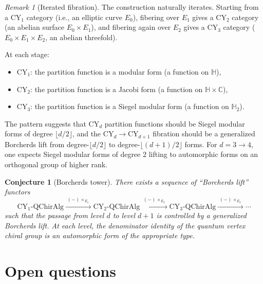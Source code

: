 \documentclass[11pt]{article}
\theoremstyle{plain}
\newtheorem{conjecture}[theorem]{Conjecture}
\theoremstyle{definition}
\theoremstyle{remark}
\newtheorem{remark}[theorem]{Remark}
\newcommand{\CY}{\mathrm{CY}}
\begin{document}
\begin{remark}[Iterated fibration]
\label{rmk:iterated}
The construction naturally iterates. Starting from a $\CY_1$ category (i.e., an
elliptic curve $E_0$), fibering over $E_1$ gives a $\CY_2$ category (an abelian
surface $E_0 \times E_1$), and fibering again over $E_2$ gives a $\CY_3$
category ($E_0 \times E_1 \times E_2$, an abelian threefold).

At each stage:
\begin{itemize}
\item $\CY_1$: the partition function is a modular form (a function on $\mathbb{H}$),
\item $\CY_2$: the partition function is a Jacobi form (a function on $\mathbb{H} \times \mathbb{C}$),
\item $\CY_3$: the partition function is a Siegel modular form (a function on $\mathbb{H}_2$).
\end{itemize}
The pattern suggests that $\CY_d$ partition functions should be Siegel modular
forms of degree $\lfloor d/2 \rfloor$, and the $\CY_d \to \CY_{d+1}$ fibration
should be a generalized Borcherds lift from degree-$\lfloor d/2 \rfloor$ to
degree-$\lfloor (d+1)/2 \rfloor$ forms. For $d = 3 \to 4$, one expects
Siegel modular forms of degree $2$ lifting to automorphic forms on an
orthogonal group of higher rank.
\end{remark}

\begin{conjecture}[Borcherds tower]
\label{conj:borcherds-tower}
There exists a sequence of ``Borcherds lift'' functors
\[
 \CY_1\text{-}\mathrm{QChirAlg}
 \xrightarrow{\;(-) \times_{E_1}\;}
 \CY_2\text{-}\mathrm{QChirAlg}
 \xrightarrow{\;(-) \times_{E_2}\;}
 \CY_3\text{-}\mathrm{QChirAlg}
 \xrightarrow{\;(-) \times_{E_3}\;}
 \cdots
\]
such that the passage from level $d$ to level $d+1$ is controlled by a
generalized Borcherds lift. At each level, the denominator identity of the
quantum vertex chiral group is an automorphic form of the appropriate type.
\end{conjecture}

\section{Open questions}
\label{sec:fib-open}
\end{document}
